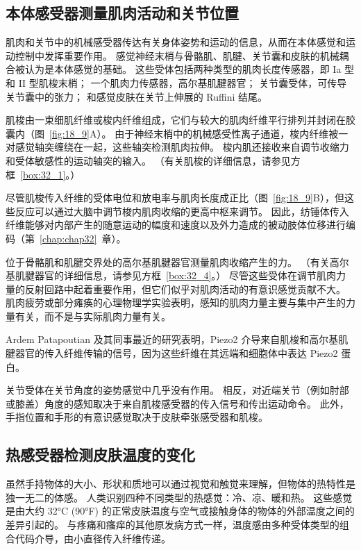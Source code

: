 \subsection{本体感受器测量肌肉活动和关节位置}

肌肉和关节中的机械感受器传达有关身体姿势和运动的信息，从而在本体感觉和运动控制中发挥重要作用。
感觉神经末梢与骨骼肌、肌腱、关节囊和皮肤的机械耦合被认为是本体感觉的基础。
这些受体包括两种类型的肌肉长度传感器，即 Ia 型和 II 型肌梭末梢；
一个肌肉力传感器，高尔基肌腱器官；
关节囊受体，可传导关节囊中的张力；
和感觉皮肤在关节上伸展的 Ruffini 结尾。


肌梭由一束细肌纤维或梭内纤维组成，它们与较大的肌肉纤维平行排列并封闭在胶囊内（图~\ref{fig:18_9}A）。
由于神经末梢中的机械感受性离子通道，梭内纤维被一对感觉轴突缠绕在一起，这些轴突检测肌肉拉伸。
梭内肌还接收来自调节收缩力和受体敏感性的运动轴突的输入。
（有关肌梭的详细信息，请参见方框~\ref{box:32_1}。）


尽管肌梭传入纤维的受体电位和放电率与肌肉长度成正比（图~\ref{fig:18_9}B），但这些反应可以通过大脑中调节梭内肌肉收缩的更高中枢来调节。
因此，纺锤体传入纤维能够对内部产生的随意运动的幅度和速度以及外力造成的被动肢体位移进行编码（第~\ref{chap:chap32}~章）。


位于骨骼肌和肌腱交界处的高尔基肌腱器官测量肌肉收缩产生的力。
（有关高尔基肌腱器官的详细信息，请参见方框~\ref{box:32_4}。）
尽管这些受体在调节肌肉力量的反射回路中起着重要作用，但它们似乎对肌肉活动的有意识感觉贡献不大。
肌肉疲劳或部分瘫痪的心理物理学实验表明，感知的肌肉力量主要与集中产生的力量有关，而不是与实际肌肉力量有关。


Ardem Patapoutian 及其同事最近的研究表明，Piezo2 介导来自肌梭和高尔基肌腱器官的传入纤维传输的信号，因为这些纤维在其远端和细胞体中表达 Piezo2 蛋白。


关节受体在关节角度的姿势感觉中几乎没有作用。
相反，对近端关节（例如肘部或膝盖）角度的感知取决于来自肌梭感受器的传入信号和传出运动命令。
此外，手指位置和手形的有意识感觉取决于皮肤牵张感受器和肌梭。



\subsection{热感受器检测皮肤温度的变化}

虽然手持物体的大小、形状和质地可以通过视觉和触觉来理解，但物体的热特性是独一无二的体感。
人类识别四种不同类型的热感觉：冷、凉、暖和热。
这些感觉是由大约 32°C (90°F) 的正常皮肤温度与空气或接触身体的物体的外部温度之间的差异引起的。
与疼痛和瘙痒的其他原发病方式一样，温度感由多种受体类型的组合代码介导，由小直径传入纤维传递。


